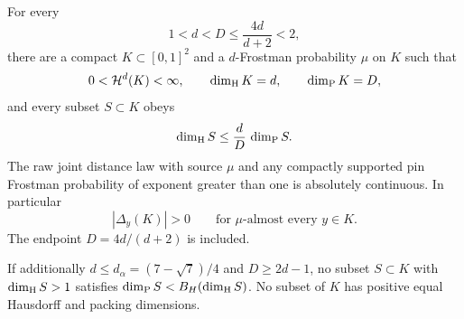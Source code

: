 \begin{theorem}
\label{sparsemoran:theorem}
For every
\begin{equation}\label{sparsemoran:range}
 1<d<D\le\frac{4d}{d+2}<2,
\end{equation}
there are a compact \(K\subset[0,1]^2\) and a \(d\)-Frostman
probability \(\mu\) on \(K\) such that
\[
 0<\mathcal H^d(K)<\infty,\qquad \dim_{\mathrm H} K=d,\qquad \dim_{\mathrm P} K=D,
\]
and every subset \(S\subset K\) obeys
\begin{equation}\label{sparsemoran:hereditary}
 \dim_{\mathrm H} S\le\frac dD\,\dim_{\mathrm P} S.
\end{equation}
The raw joint distance law with source \(\mu\) and any compactly
supported pin Frostman probability of exponent greater than one
is absolutely continuous. In particular
\[
 |\Delta_y(K)|>0\qquad\text{for \(\mu\)-almost every }y\in K.
\]
The endpoint \(D=4d/(d+2)\) is included.

If additionally \(d\le d_\alpha=(7-\sqrt7)/4\) and \(D\ge2d-1\),
no subset \(S\subset K\) with \(\dim_{\mathrm H} S>1\) satisfies
\(\dim_{\mathrm P} S<B_H(\dim_{\mathrm H} S)\). No subset of \(K\) has positive equal
Hausdorff and packing dimensions.
\end{theorem}

